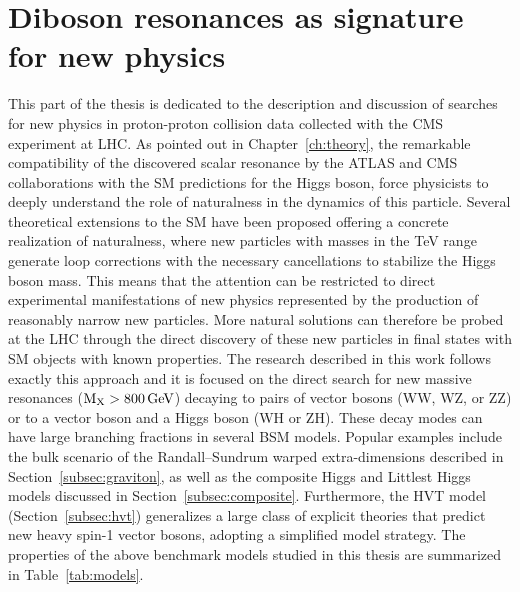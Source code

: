 \chapter{Diboson resonances as signature for new physics}
\label{ch:dibosonIntro}

This part of the thesis is dedicated to the description and discussion of searches for new physics in proton-proton collision data collected with the CMS experiment at LHC.
As pointed out in Chapter~\ref{ch:theory}, the remarkable compatibility of the discovered scalar resonance by the ATLAS and CMS collaborations with the SM predictions for the Higgs boson,
force physicists to deeply understand the role of naturalness in the dynamics of this particle.
Several theoretical extensions to the SM have been proposed offering a concrete realization of naturalness,
where new particles with masses in the TeV range generate loop corrections with the necessary cancellations to stabilize the Higgs boson mass.
This means that the attention can be restricted to direct experimental manifestations of new physics represented by the production of reasonably narrow new particles.
More natural solutions can therefore be probed at the LHC through the direct discovery of these new particles in final states with SM objects with known properties.
The research described in this work follows exactly this approach and it is focused on the direct search for new massive resonances ($\mathrm{M}_\mathrm{X} > 800\,\text{Ge\hspace{-.08em}V}$) decaying to
pairs of vector bosons (WW, WZ, or ZZ)
or to a vector boson and a Higgs boson (WH or ZH).
These decay modes can have large branching fractions in several BSM models. 
Popular examples include the bulk scenario of the Randall--Sundrum warped extra-dimensions described in Section~\ref{subsec:graviton},
as well as the composite Higgs and Littlest Higgs models discussed in Section~\ref{subsec:composite}.
Furthermore, the HVT model (Section~\ref{subsec:hvt}) generalizes a large class of explicit theories that predict new heavy spin-1 vector bosons,
adopting a simplified model strategy.
The properties of the above benchmark models studied in this thesis are summarized in Table~\ref{tab:models}.\\

